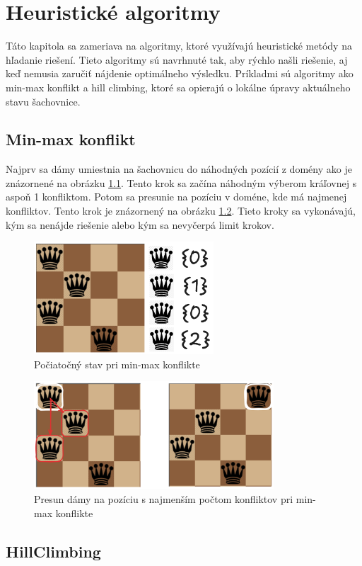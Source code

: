 

\chapter{Heuristické algoritmy}

Táto kapitola sa zameriava na algoritmy, ktoré využívajú heuristické metódy na hľadanie riešení. Tieto algoritmy sú navrhnuté tak, aby rýchlo našli riešenie, aj keď nemusia zaručiť nájdenie optimálneho výsledku. Príkladmi sú algoritmy ako min-max konflikt a hill climbing, ktoré sa opierajú o lokálne úpravy aktuálneho stavu šachovnice.

\section*{Min-max konflikt}
Najprv sa dámy umiestnia na šachovnicu do náhodných pozícií z domény ako je znázornené na obrázku \ref{fig:min-max-zero-step}. Tento krok sa začína náhodným výberom kráľovnej s aspoň 1 konfliktom. Potom sa presunie na pozíciu v doméne, kde má najmenej konfliktov. Tento krok je znázornený na obrázku \ref{fig:min-max-step}. Tieto kroky sa vykonávajú, kým sa nenájde riešenie alebo kým sa nevyčerpá limit krokov.
\begin{figure}
    \centering
    \includegraphics[width=0.6\textwidth]{figs/min-max/min-max-zero-step}
    \caption{Počiatočný stav pri min-max konflikte}
    \label{fig:min-max-zero-step}
\end{figure}
\begin{figure}
    \centering
    \includegraphics[width=0.8\textwidth]{figs/min-max/min-max-step}
    \caption{Presun dámy na pozíciu s najmenším počtom konfliktov pri min-max konflikte}
    \label{fig:min-max-step}
\end{figure}

\section*{HillClimbing}
